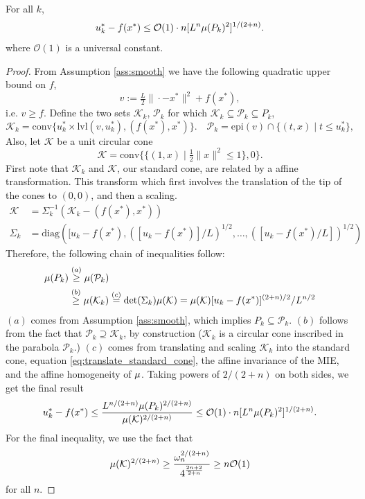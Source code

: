 \begin{lem}\label{strongly_convex_upper_bound_obj}
For all $k$,
\[
u^*_k-f(x^*)\leq\mathcal{O}(1)\cdot n[L^{n}\mu(P_k)^2]^{1/(2+n)}.
\]
where $\mathcal{O}(1)$ is a universal constant.
\end{lem}
\begin{proof}
From Assumption \ref{ass:smooth} we have the following quadratic upper bound
on $f$, 
\[
v:=\tfrac{L}{2}\|\cdot-x^*\|^2+f(x^*),
\]
i.e. $v \geq f$. Define the two sets $\mathcal{K}_k$, $\mathcal{P}_k$ for which 
$\mathcal{K}_k \subseteq \mathcal{P}_k \subseteq P_k$,
\begin{equation*}
  \mathcal{K}_k  =\mbox{conv}\{u^*_k\times\mbox{lvl}(v,u^*_k),(f(x^*),x^*)\}.
  \quad
  \mathcal{P}_k  =\mbox{epi}(v)\cap\{(t,x)\mid t\leq u^*_k\},
\end{equation*}
Also, let $\mathcal{K}$ be a unit circular cone
\[
\mathcal{K}=\mbox{conv}\big\{\{(1,x)\mid \tfrac{1}{2}\|x\|^2\leq1\},0\big\}.
\]
First note that $\mathcal{K}_k$ and $\mathcal{K}$, our standard cone, are related
by a affine transformation. This transform which first involves the translation of the tip of the cones to $(0,0)$, and then a scaling.
\begin{align}\label{eq:translate_standard_cone}
\mathcal{K} & =\Sigma^{-1}_k(\mathcal{K}_k-(f(x^*),x^*))\\
\Sigma_k & =\mbox{diag}([u_k-f(x^*),([u_k-f(x^*)]/L)^{1/2},\dots,([u_k-f(x^*)/L])^{1/2})
\end{align}
Therefore, the following chain of inequalities follow:
\begin{align*}
\mu(P_k) & \overset{(a)}{\geq}\mu(\mathcal{P}_k) \\
& \overset{(b)}{\geq}\mu(\mathcal{\mathcal{K}}_k) 
 \overset{(c)}{=}\det(\Sigma_k)\mu(\mathcal{K})  
=\mu(\mathcal{K})[u_k-f(x^*)]^{(2+n)/2}/L^{n/2}
\end{align*}
$(a)$ comes from Assumption \eqref{ass:smooth}, which implies $P_k \subseteq \mathcal{P}_k$.
$(b)$ follows from the fact that $\mathcal{P}_k\supseteq\mathcal{K}_k$,
by construction ($\mathcal{K}_k$ is a circular cone inscribed in the parabola
$\mathcal{P}_k$.)
$(c)$ comes from translating and scaling $\mathcal{K}_k$ into the standard cone, equation \eqref{eq:translate_standard_cone},  the affine invariance of the MIE, and the affine homogeneity of $\mu$. Taking powers of $2/(2+n)$ on both sides, we get the final result
\[
u^*_k-f(x^*)
\leq\frac{L^{n/(2+n)} \mu(P_k)^{2/(2+n)}}{\mu(\mathcal{K})^{2/(2+n)}}
\leq\mathcal{O}(1)\cdot n[L^n\mu(P_k)^2]^{1/(2+n)}.
\]
For the final inequality, we use the fact that 
$$\mu(\mathcal{K})^{2/(2+n)}\geq \frac{\omega_{n}^{2/(2+n)}}{4^{\frac{2n+2}{2+n}}}\geq n \mathcal{O}(1)$$ 
for all $n$.
\end{proof}

